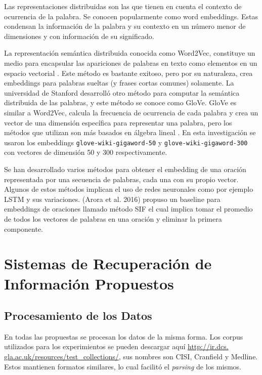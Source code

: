 \documentclass{llncs}
\begin{document}
Las representaciones distribuidas son las que tienen en cuenta el contexto de ocurrencia de la palabra. Se conocen popularmente como word embeddings. Estas condensan la información de la palabra y su contexto en un número menor de dimensiones y con información de su significado.

La representación semántica distribuida conocida como Word2Vec, constituye un medio para encapsular las apariciones de palabras en texto como elementos en un espacio vectorial \cite{2}. Este método es bastante exitoso, pero por su naturaleza, crea embeddings para palabras sueltas (y frases cortas comunes) solamente. La universidad de Stanford desarrolló otro método para computar la semántica distribuida de las palabras, y este método se conoce como GloVe. GloVe es similar a Word2Vec, calcula la frecuencia de ocurrencia de cada palabra y crea un vector de una dimensión específica para representar una palabra, pero los métodos que utilizan son más basados en álgebra lineal \cite{0}. En esta investigación se usaron los embeddings \texttt{glove-wiki-gigaword-50} y \texttt{glove-wiki-gigaword-300} con vectores de dimensión 50 y 300 respectivamente.

Se han desarrollado varios métodos para obtener el embedding de una oración representada por una secuencia de palabras, cada una con su propio vector. Algunos de estos métodos implican el uso de redes neuronales como por ejemplo LSTM y sus variaciones. (Arora et al. 2016) \cite{1} propuso un baseline para embeddings de oraciones llamado método SIF el cual implica tomar el promedio de todos los vectores de palabras en una oración y eliminar la primera componente. 

\section{Sistemas de Recuperación de Información Propuestos}


\subsection{Procesamiento de los Datos}

En todas las propuestas se procesan los datos de la misma forma. Los corpus utilizados para los experimientos se pueden descargar aquí \href{http://ir.dcs.gla.ac.uk/resources/test_collections/} {http://ir.dcs. gla.ac.uk/resources/test\_collections/}, sus nombres son CISI, Cranfield y Medline. Estos mantienen formatos similares, lo cual facilitó el \textit{parsing} de los mismos.
\end{document}
